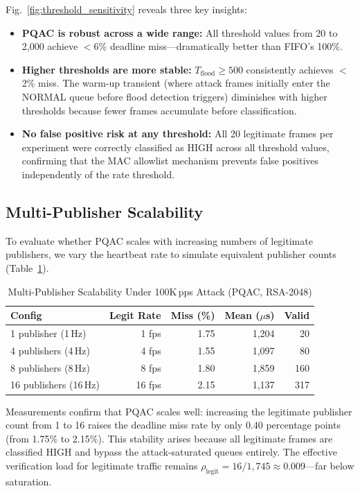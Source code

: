 \documentclass[journal]{IEEEtran}
\begin{document}
Fig.~\ref{fig:threshold_sensitivity} reveals three key insights:
\begin{itemize}[leftmargin=*]
    \item \textbf{PQAC is robust across a wide range:} All threshold values from 20 to 2,000 achieve $<$6\% deadline miss---dramatically better than FIFO's 100\%.
    \item \textbf{Higher thresholds are more stable:} $T_{\text{flood}} \geq 500$ consistently achieves $<$2\% miss. The warm-up transient (where attack frames initially enter the NORMAL queue before flood detection triggers) diminishes with higher thresholds because fewer frames accumulate before classification.
    \item \textbf{No false positive risk at any threshold:} All 20 legitimate frames per experiment were correctly classified as HIGH across all threshold values, confirming that the MAC allowlist mechanism prevents false positives independently of the rate threshold.
\end{itemize}

\subsection{Multi-Publisher Scalability}
To evaluate whether PQAC scales with increasing numbers of legitimate publishers, we vary the heartbeat rate to simulate equivalent publisher counts (Table~\ref{tab:scalability}).

\begin{table}[t]
\caption{Multi-Publisher Scalability Under 100K\,pps Attack (PQAC, RSA-2048)}
\label{tab:scalability}
\centering
\small
\begin{tabular}{lrrrr}
\toprule
\textbf{Config} & \textbf{Legit Rate} & \textbf{Miss (\%)} & \textbf{Mean ($\mu$s)} & \textbf{Valid} \\
\midrule
1 publisher (1\,Hz)   & 1 fps  & 1.75 & 1,204 & 20  \\
4 publishers (4\,Hz)  & 4 fps  & 1.55 & 1,097 & 80  \\
8 publishers (8\,Hz)  & 8 fps  & 1.80 & 1,859 & 160 \\
16 publishers (16\,Hz) & 16 fps & 2.15 & 1,137 & 317 \\
\bottomrule
\end{tabular}
\end{table}

Measurements confirm that PQAC scales well: increasing the legitimate publisher count from 1 to 16 raises the deadline miss rate by only 0.40 percentage points (from 1.75\% to 2.15\%). This stability arises because all legitimate frames are classified HIGH and bypass the attack-saturated queues entirely. The effective verification load for legitimate traffic remains $\rho_{\text{legit}} = 16/1{,}745 \approx 0.009$---far below saturation.
\end{document}
